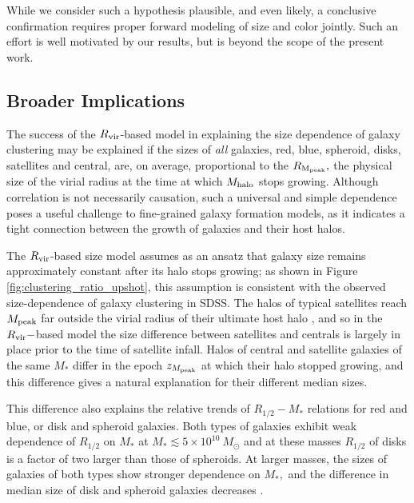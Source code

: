 \documentclass[usenatbib,usegraphicx,letterpaper]{mn2e}
\newcommand{\rhalf}{R_{1/2}}
\newcommand{\mstar}{M_{\ast}}
\newcommand{\mpeak}{M_{\rm peak}}
\newcommand{\zpeak}{z_{M_{\rm peak}}}
\newcommand{\mhalo}{M_{\rm halo}}
\newcommand{\rvir}{R_{\rm vir}}
\newcommand{\rmpeak}{R_{\rm M_{peak}}}
\begin{document}
While we consider such a hypothesis plausible, and even likely, a conclusive confirmation requires proper forward modeling of size and color jointly. Such an effort is well motivated by our results, but is beyond the scope of the present work.

\subsection{Broader Implications}
\label{subsec:broader_implications}

The success of the $\rvir$-based model in explaining the size dependence of galaxy clustering may be explained if the sizes of {\it all} galaxies, red, blue, spheroid, disks, satellites and central, are, on average, proportional to the $\rmpeak,$ the physical size of the virial radius at the time at which $\mhalo$ stops growing. Although correlation is not necessarily causation, such a universal and simple dependence poses a useful challenge to fine-grained galaxy formation models, as it indicates a tight connection between the growth of galaxies and their host halos.

The $\rvir$-based size model assumes as an ansatz that galaxy size remains approximately constant after its halo stops growing; as shown in Figure \ref{fig:clustering_ratio_upshot}, this assumption is consistent with the observed size-dependence of galaxy clustering in SDSS.  The halos of typical satellites reach $\mpeak$ far outside the virial radius of their ultimate host halo \citep{behroozi_etal14}, and so in the $\rvir-$based model the size difference between satellites and centrals is largely in place prior to the time of satellite infall. Halos of central and satellite galaxies of the same $\mstar$ differ in the epoch $\zpeak$ at which their halo stopped growing, and this difference gives a natural explanation for their different median sizes.

This difference also explains the relative trends of $\rhalf-\mstar$ relations for red and blue, or disk and spheroid galaxies.
Both types of galaxies exhibit weak dependence of $\rhalf$ on $\mstar$ at $\mstar\lesssim 5\times 10^{10}\ M_\odot$ and
at these masses $\rhalf$ of disks is a factor of two larger than those of spheroids. At larger masses, the sizes of galaxies of both types show stronger dependence on $\mstar,$ and the difference in median size of disk and spheroid galaxies decreases \citep[e.g.,][]{bernardi_etal14}.
\end{document}
